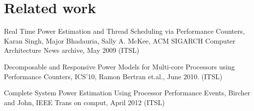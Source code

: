\section{Related work}
Real Time Power Estimation and Thread Scheduling via Performance Counters, Karan Singh, Major Bhadauria, Sally A. McKee, ACM SIGARCH Computer Architecture News archive, May 2009 (ITSL) 

Decomposable and Responsive Power Models for Multi-core Processors using Performance Counters, ICS'10, Ramon Bertran et.al., June 2010. (ITSL)

Complete System Power Estimation Using Processor Performance Events, Bircher and John, IEEE Trans on comput, April 2012 (ITSL)
